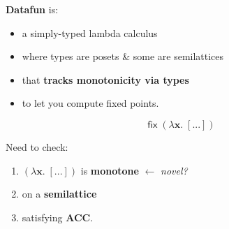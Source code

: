\documentclass{beamer}
\newcommand{\m}[1]{\ensuremath{\mathbf{#1}}}
\newcommand{\ms}{\mathsf}
\begin{document}

\begin{frame}

  \Large \textbf{Datafun} is:
  \begin{itemize}
  \item a simply-typed lambda calculus
  \item where types are posets \& some are semilattices
  \item that \textbf{tracks monotonicity via types}
  \item to let you compute fixed points.
  \end{itemize}
\end{frame}

\begin{frame}


  \Large\vspace{-2em}
  {\huge\[ {\ms{fix}\;(\lambda \m{x}.\; [...])} \]}

  Need to check:
  \begin{enumerate}
  \item $(\lambda \m{x}.\; [...])$ is \textbf{monotone}
    \qquad \color[rgb]{0.5,0,1.0} $\leftarrow$ \emph{novel?}
  \item \color{gray} on a \textbf{semilattice} 
  \item satisfying \textbf{ACC}.
  \end{enumerate}


\end{frame}

\end{document}
